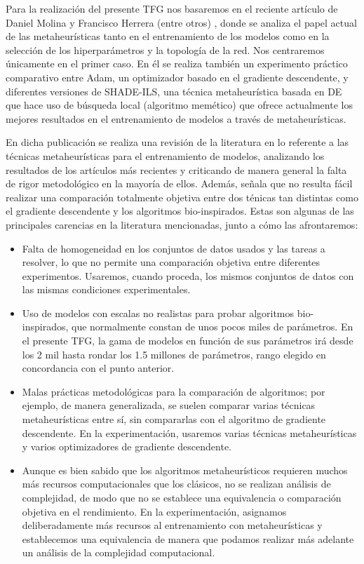 Para la realización del presente TFG nos basaremos en el reciente artículo de Daniel Molina y Francisco Herrera (entre otros) \cite{MHtrainingClase}, donde se analiza el papel actual de las metaheurísticas tanto en el entrenamiento de los modelos como en la selección de los hiperparámetros y la topología de la red. Nos centraremos únicamente en el primer caso. En él se realiza también un experimento práctico comparativo entre Adam, un optimizador basado en el gradiente descendente, y diferentes versiones de SHADE-ILS, una técnica metaheurística basada en DE que hace uso de búsqueda local (algoritmo memético) que ofrece actualmente los mejores resultados en el entrenamiento de modelos a través de metaheurísticas.

En dicha publicación se realiza una revisión de la literatura en lo referente a las técnicas metaheurísticas para el entrenamiento de modelos, analizando los resultados de los artículos más recientes y criticando de manera general la falta de rigor metodológico en la mayoría de ellos. Además, señala que no resulta fácil realizar una comparación totalmente objetiva entre dos ténicas tan distintas como el gradiente descendente y los algoritmos bio-inspirados. Estas son algunas de las principales carencias en la literatura mencionadas, junto a cómo las afrontaremos:

\begin{itemize}

\item Falta de homogeneidad en los conjuntos de datos usados y las tareas a resolver, lo que no permite una comparación objetiva entre diferentes experimentos. Usaremos, cuando proceda, los mismos conjuntos de datos con las mismas condiciones experimentales.

\item Uso de modelos con escalas no realistas para probar algoritmos bio-inspirados, que normalmente constan de unos pocos miles de parámetros. En el presente TFG, la gama de modelos en función de sus parámetros irá desde los 2 mil hasta rondar los 1.5 millones de parámetros, rango elegido en concordancia con el punto anterior.

\item Malas prácticas metodológicas para la comparación de algoritmos; por ejemplo, de manera generalizada, se suelen comparar varias técnicas metaheurísticas entre sí, sin compararlas con el algoritmo de gradiente descendente. En la experimentación, usaremos varias técnicas metaheurísticas y varios optimizadores de gradiente descendente.

\item Aunque es bien sabido que los algoritmos metaheurísticos requieren muchos más recursos computacionales que los clásicos, no se realizan análisis de complejidad, de modo que no se establece una equivalencia o comparación objetiva en el rendimiento. En la experimentación, asignamos deliberadamente más recursos al entrenamiento con metaheurísticas y establecemos una equivalencia de manera que podamos realizar más adelante un análisis de la complejidad computacional.
\end{itemize}

